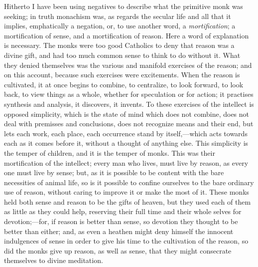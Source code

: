Hitherto I have been using negatives to describe what the primitive
monk was seeking; in truth monachism was, as regards the secular life
and all that it implies, emphatically a negation, or, to use another
word, a \emph{mortification}; a mortification of sense, and a
mortification of reason. Here a word of explanation is necessary. The
monks were too good Catholics to deny that reason was a divine gift,
and had too much common sense to think to do without it. What they
denied themselves was the various and manifold exercises of the
reason; and on this account, because such exercises were excitements.
When the reason is cultivated, it at once begins to combine, to
centralize, to look forward, to look back, to view things as a
whole, whether for speculation or for action; it practises synthesis
and analysis, it discovers, it invents. To these exercises of the
intellect is opposed simplicity, which is the state of mind which does
not combine, does not deal with premisses and conclusions, does not
recognize means and their end, but lets each work, each place, each
occurrence stand by itself,—which acts towards each as it comes
before it, without a thought of anything else. This simplicity is the
temper of children, and it is the temper of monks. This was their
mortification of the intellect; every man who lives, must live by
reason, as every one must live by sense; but, as it is possible to be
content with the bare necessities of animal life, so is it possible to
confine ourselves to the bare ordinary use of reason, without caring
to improve it or make the most of it. These monks held both sense and
reason to be the gifts of heaven, but they used each of them as little
as they could help, reserving their full time and their whole selves
for devotion;—for, if reason is better than sense, so devotion they
thought to be better than either; and, as even a heathen might deny
himself the innocent indulgences of sense in order to give his time to
the cultivation of the reason, so did the monks give up reason, as
well as sense, that they might consecrate themselves to divine
meditation.

